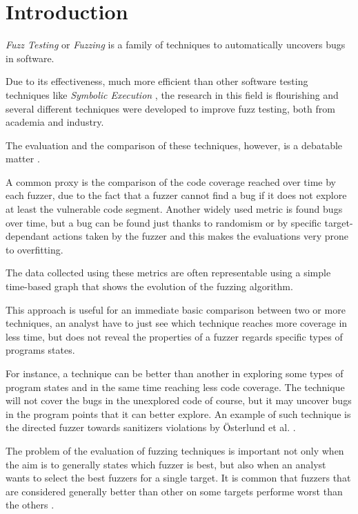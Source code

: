 \documentclass[conference,compsoc]{IEEEtran}
\begin{document}
\section{Introduction}

{\em Fuzz Testing} or {\em Fuzzing} is a family of techniques to automatically uncovers bugs in software.

Due to its effectiveness, much more efficient than other software testing techniques like {\it Symbolic Execution} \cite{redqueen} \cite{sebastian}, the research in this field is flourishing and several different techniques were developed to improve fuzz testing, both from academia and industry.

The evaluation and the comparison of these techniques, however, is a debatable matter \cite{fuzzeval}.

A common proxy is the comparison of the code coverage reached over time by each fuzzer, due to the fact that a fuzzer cannot find a bug if it does not explore at least the vulnerable code segment.
Another widely used metric is found bugs over time, but a bug can be found just thanks to randomism or by specific target-dependant actions taken by the fuzzer and this makes the evaluations very prone to overfitting.

The data collected using these metrics are often representable using a simple time-based graph that shows the evolution of the fuzzing algorithm.

This approach is useful for an immediate basic comparison between two or more techniques, an analyst have to just see which technique reaches more coverage in less time, but does not reveal the properties of a fuzzer regards specific types of programs states.

For instance, a technique can be better than another in exploring some types of program states and in the same time reaching less code coverage.
The technique will not cover the bugs in the unexplored code of course, but it may uncover bugs in the program points that it can better explore.
An example of such technique is the directed fuzzer towards sanitizers violations by \"Osterlund et al. \cite{parmesan}.

The problem of the evaluation of fuzzing techniques is important not only when the aim is to generally states which fuzzer is best, but also when an analyst wants to select the best fuzzers for a single target. It is common that fuzzers that are considered generally better than other on some targets performe worst than the others \cite{aflplusplus}.
\end{document}
